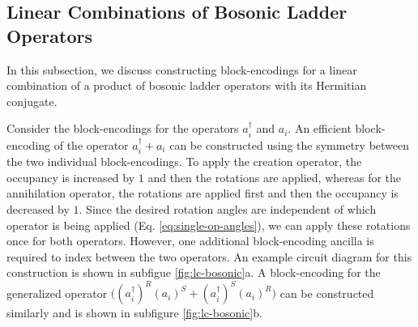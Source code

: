 \subsection{Linear Combinations of Bosonic Ladder Operators}

In this subsection, we discuss constructing block-encodings for a linear combination of a product of bosonic ladder operators with its Hermitian conjugate.


\begin{figure*}
    
    
    \caption{
        \textbf{Block-Encoding Product of Bosonic Ladder Operators Plus Hermitian Conjugate}
        In (a), a block-encoding for the operator $(a_i^\dagger + a_i)$ is given.
        In (b), a block-encoding for the operator $\big((a_i^\dagger)^R (a_i)^S + (a_i^\dagger)^S (a_i)^R\big)$ is given.
    }
    \label{fig:lc-bosonic}
\end{figure*}


Consider the block-encodings for the operators $a_i^\dagger$ and $a_i$.
An efficient block-encoding of the operator $a_i^\dagger + a_i$ can be constructed using the symmetry between the two individual block-encodings. 
To apply the creation operator, the occupancy is increased by $1$ and then the rotations are applied, whereas for the annihilation operator, the rotations are applied first and then the occupancy is decreased by $1$.
Since the desired rotation angles are independent of which operator is being applied (Eq. \ref{eq:single-op-angles}), we can apply these rotations once for both operators.
However, one additional block-encoding ancilla is required to index between the two operators.
An example circuit diagram for this construction is shown in subfigue \ref{fig:lc-bosonic}a.
A block-encoding for the generalized operator $\big((a_i^\dagger)^R (a_i)^S + (a_i^\dagger)^S (a_i)^R\big)$ can be constructed similarly and is shown in subfigure \ref{fig:lc-bosonic}b.

\begin{figure*}
    
    \caption{
        \textbf{Generalized Block-Encoding Product of Bosonic Ladder Operators Plus Hermitian Conjugate}
        A block-encoding for the operator $((a_i^\dagger)^{R_i} + a_i^{S_i})((a_j^\dagger)^{R_j} + a_j^{S_j})...((a_m^\dagger)^{R_m} + a_m^{S_m}) + h.c.$ is given.
    }
    \label{fig:lc-bosonic-general}
\end{figure*}

